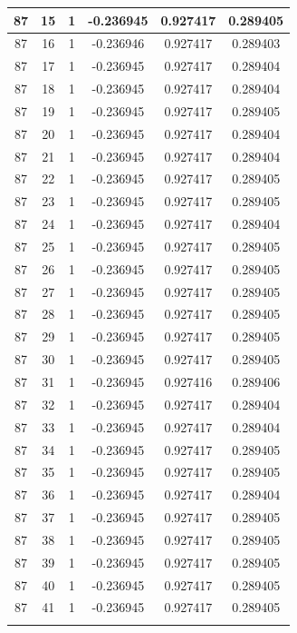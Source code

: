 \documentclass[12pt,a4paper]{article}
\numberwithin{equation}{section}
\numberwithin{figure}{section}
\numberwithin{table}{section}
\begin{document}
\begin{longtable}{|c|c|c|c|c|c|}
87 & 15 & 1 & -0.236945 & 0.927417 & 0.289405 \\ \hline
87 & 16 & 1 & -0.236946 & 0.927417 & 0.289403 \\ \hline
87 & 17 & 1 & -0.236945 & 0.927417 & 0.289404 \\ \hline
87 & 18 & 1 & -0.236945 & 0.927417 & 0.289404 \\ \hline
87 & 19 & 1 & -0.236945 & 0.927417 & 0.289405 \\ \hline
87 & 20 & 1 & -0.236945 & 0.927417 & 0.289404 \\ \hline
87 & 21 & 1 & -0.236945 & 0.927417 & 0.289404 \\ \hline
87 & 22 & 1 & -0.236945 & 0.927417 & 0.289405 \\ \hline
87 & 23 & 1 & -0.236945 & 0.927417 & 0.289405 \\ \hline
87 & 24 & 1 & -0.236945 & 0.927417 & 0.289404 \\ \hline
87 & 25 & 1 & -0.236945 & 0.927417 & 0.289405 \\ \hline
87 & 26 & 1 & -0.236945 & 0.927417 & 0.289405 \\ \hline
87 & 27 & 1 & -0.236945 & 0.927417 & 0.289405 \\ \hline
87 & 28 & 1 & -0.236945 & 0.927417 & 0.289405 \\ \hline
87 & 29 & 1 & -0.236945 & 0.927417 & 0.289405 \\ \hline
87 & 30 & 1 & -0.236945 & 0.927417 & 0.289405 \\ \hline
87 & 31 & 1 & -0.236945 & 0.927416 & 0.289406 \\ \hline
87 & 32 & 1 & -0.236945 & 0.927417 & 0.289404 \\ \hline
87 & 33 & 1 & -0.236945 & 0.927417 & 0.289404 \\ \hline
87 & 34 & 1 & -0.236945 & 0.927417 & 0.289405 \\ \hline
87 & 35 & 1 & -0.236945 & 0.927417 & 0.289405 \\ \hline
87 & 36 & 1 & -0.236945 & 0.927417 & 0.289404 \\ \hline
87 & 37 & 1 & -0.236945 & 0.927417 & 0.289405 \\ \hline
87 & 38 & 1 & -0.236945 & 0.927417 & 0.289405 \\ \hline
87 & 39 & 1 & -0.236945 & 0.927417 & 0.289405 \\ \hline
87 & 40 & 1 & -0.236945 & 0.927417 & 0.289405 \\ \hline
87 & 41 & 1 & -0.236945 & 0.927417 & 0.289405 \\ \hline
\pagebreak

\end{longtable}
\end{document}
